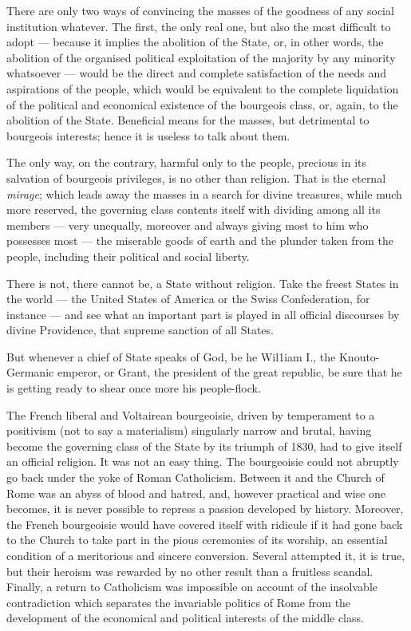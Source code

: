 \documentclass[12pt]{report}
\begin{document}
There are only two ways of convincing the masses of the goodness of any social institution whatever. The first, the only real one, but also the most difficult to adopt — because it implies the abolition of the State, or, in other words, the abolition of the organised political exploitation of the majority by any minority whatsoever — would be the direct and complete satisfaction of the needs and aspirations of the people, which would be equivalent to the complete liquidation of the political and economical existence of the bourgeois class, or, again, to the abolition of the State. Beneficial means for the masses, but detrimental to bourgeois interests; hence it is useless to talk about them.


The only way, on the contrary, harmful only to the people, precious in its salvation of bourgeois privileges, is no other than religion. That is the eternal \emph{mirage}; which leads away the masses in a search for divine treasures, while much more reserved, the governing class contents itself with dividing among all its members — very unequally, moreover and always giving most to him who possesses most — the miserable goods of earth and the plunder taken from the people, including their political and social liberty.


There is not, there cannot be, a State without religion. Take the freest States in the world — the United States of America or the Swiss Confederation, for instance — and see what an important part is played in all official discourses by divine Providence, that supreme sanction of all States.


But whenever a chief of State speaks of God, be he Wil1iam I., the Knouto-Germanic emperor, or Grant, the president of the great republic, be sure that he is getting ready to shear once more his people-flock.


The French liberal and Voltairean bourgeoisie, driven by temperament to a positivism (not to say a materialism) singularly narrow and brutal, having become the governing class of the State by its triumph of 1830, had to give itself an official religion. It was not an easy thing. The bourgeoisie could not abruptly go back under the yoke of Roman Catholicism. Between it and the Church of Rome was an abyss of blood and hatred, and, however practical and wise one becomes, it is never possible to repress a passion developed by history. Moreover, the French bourgeoisie would have covered itself with ridicule if it had gone back to the Church to take part in the pious ceremonies of its worship, an essential condition of a meritorious and sincere conversion. Several attempted it, it is true, but their heroism was rewarded by no other result than a fruitless scandal. Finally, a return to Catholicism was impossible on account of the insolvable contradiction which separates the invariable politics of Rome from the development of the economical and political interests of the middle class.
\end{document}
